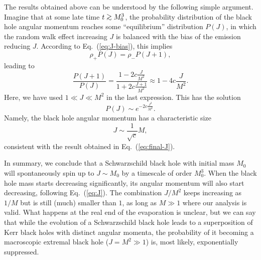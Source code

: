\documentclass[12pt]{article}
\begin{document}
The results obtained above can be understood by the following simple 
argument.  Imagine that at some late time $t \simgt M_0^3$, the probability 
distribution of the black hole angular momentum reaches some ``equilibrium'' 
distribution $P(J)$, in which the random walk effect increasing $J$ 
is balanced with the bias of the emission reducing $J$.  According to 
Eq.~(\ref{eq:J-bias}), this implies
%
\begin{equation}
  \rho_+ P(J) = \rho_- P(J+1),
\label{eq:balance}
\end{equation}
%
leading to
%
\begin{equation}
  \frac{P(J+1)}{P(J)} = \frac{1-2c\frac{J}{M^2}}{1+2c\frac{J+1}{M^2}} 
  \approx 1 - 4c \frac{J}{M^2}.
\label{eq:balance-2}
\end{equation}
%
Here, we have used $1 \ll J \ll M^2$ in the last expression.  This has 
the solution
%
\begin{equation}
  P(J) \sim e^{-2c \frac{J^2}{M^2}}.
\label{eq:balance-sol}
\end{equation}
%
Namely, the black hole angular momentum has a characteristic size
%
\begin{equation}
  J \sim \frac{1}{\sqrt{c}} M,
\label{eq:J}
\end{equation}
%
consistent with the result obtained in Eq.~(\ref{eq:final-J}).

In summary, we conclude that a Schwarzschild black hole with initial mass 
$M_0$ will spontaneously spin up to $J \sim M_0$ by a timescale of order 
$M_0^3$.  When the black hole mass starts decreasing significantly, its 
angular momentum will also start decreasing, following Eq.~(\ref{eq:J}). 
The combination $J/M^2$ keeps increasing as $1/M$ but is still (much) 
smaller than $1$, as long as $M \gg 1$ where our analysis is valid. 
What happens at the real end of the evaporation is unclear, but we can 
say that while the evolution of a Schwarzschild black hole leads to a 
superposition of Kerr black holes with distinct angular momenta, the 
probability of it becoming a macroscopic extremal black hole ($J = M^2 
\gg 1$) is, most likely, exponentially suppressed.
\end{document}
